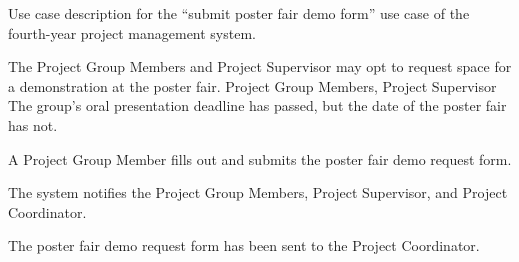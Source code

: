 \documentclass[document.tex]{subfiles}
\begin{document}
\begin{table}
  \centering
  \caption{Use case description for the ``submit poster fair demo form'' use case of the fourth-year project management system.}
  \label{tbl:use-case-poster-fair-form}

  \begin{usecase}
    The Project Group Members and Project Supervisor may opt to request space for a demonstration at the poster fair.
    Project Group Members, Project Supervisor
    The group’s oral presentation deadline has passed, but the date of the poster fair has not.
    \ucnormal
    \begin{ucenum}
      \item A Project Group Member fills out and submits the poster fair demo request form.
      \item The system notifies the Project Group Members, Project Supervisor, and Project Coordinator.
    \end{ucenum}
    The poster fair demo request form has been sent to the Project Coordinator.
  \end{usecase}
\end{table}
\end{document}
